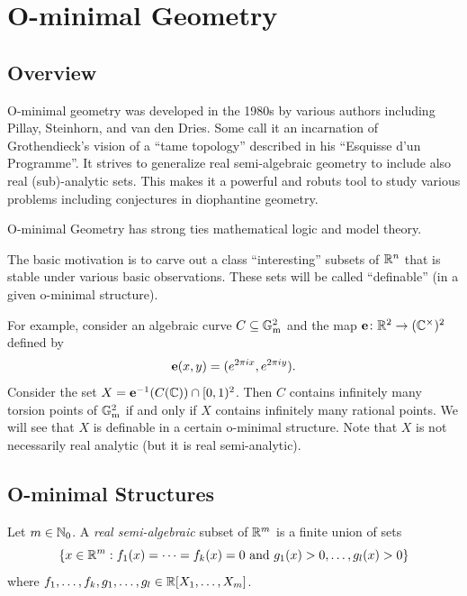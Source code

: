 \chapter{O-minimal Geometry}
\section{Overview}

O-minimal geometry was developed in the 1980s by various authors
including Pillay, Steinhorn, and van den Dries. Some call it an
incarnation of Grothendieck's vision of a ``tame topology'' described
in his ``Esquisse d'un Programme''. It strives to generalize real
semi-algebraic geometry to include also real (sub)-analytic sets.
This makes it a powerful and robuts tool to study various problems
including conjectures in diophantine geometry.

O-minimal Geometry has strong ties mathematical logic and model
theory. 

The basic motivation is to carve out a class ``interesting'' subsets
of ${\mathbb{R}}^n$ that is stable under various basic observations. These sets
will be called ``definable'' (in a given o-minimal structure). 

For example, consider an algebraic curve $C\subseteq {\mathbb{G}}_{\mathrm{m}}^2$ and
the map $\mathbf{e} \colon{\mathbb{R}}^2\rightarrow ({\mathbb{C}}^\times)^2$ defined by
\begin{equation*}
  \mathbf{e}(x,y) = (e^{2\pi i x},e^{2\pi i y}). 
\end{equation*}
Consider the set $X = \mathbf{e}^{-1}(C({\mathbb{C}})) \cap [0,1)^2$. Then $C$ contains
infinitely many torsion points of ${\mathbb{G}}_{\mathrm{m}}^2$ if and only if $X$
contains infinitely many rational points.
We will see that $X$ is definable in a certain o-minimal structure.
Note that $X$ is not necessarily real analytic (but it is real
semi-analytic). 

\section{O-minimal Structures}

\begin{definition}
  Let $m\in{\mathbb{N}}_0$. 
  A \emph{real semi-algebraic} subset of ${\mathbb{R}}^m$ is a finite union
  of sets    
  \begin{equation*}
    \{x\in{\mathbb{R}}^m :f_1(x) =\cdots = f_k(x) = 0 \text{ and }
    g_1(x)>0,\ldots,g_l(x)>0\}
  \end{equation*}
  where $f_1,\ldots,f_k,g_1,\ldots,g_l\in {\mathbb{R}}[X_1,\ldots,X_m]$.
\end{definition}

